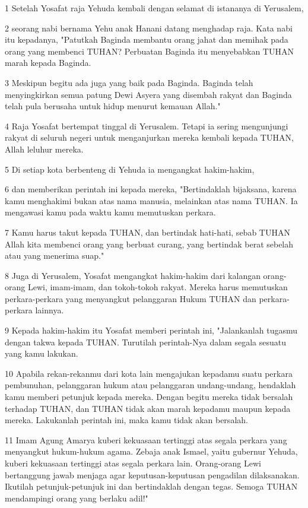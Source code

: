 \par 1 Setelah Yosafat raja Yehuda kembali dengan selamat di istananya di Yerusalem,
\par 2 seorang nabi bernama Yehu anak Hanani datang menghadap raja. Kata nabi itu kepadanya, "Patutkah Baginda membantu orang jahat dan memihak pada orang yang membenci TUHAN? Perbuatan Baginda itu menyebabkan TUHAN marah kepada Baginda.
\par 3 Meskipun begitu ada juga yang baik pada Baginda. Baginda telah menyingkirkan semua patung Dewi Asyera yang disembah rakyat dan Baginda telah pula berusaha untuk hidup menurut kemauan Allah."
\par 4 Raja Yosafat bertempat tinggal di Yerusalem. Tetapi ia sering mengunjungi rakyat di seluruh negeri untuk menganjurkan mereka kembali kepada TUHAN, Allah leluhur mereka.
\par 5 Di setiap kota berbenteng di Yehuda ia mengangkat hakim-hakim,
\par 6 dan memberikan perintah ini kepada mereka, "Bertindaklah bijaksana, karena kamu menghakimi bukan atas nama manusia, melainkan atas nama TUHAN. Ia mengawasi kamu pada waktu kamu memutuskan perkara.
\par 7 Kamu harus takut kepada TUHAN, dan bertindak hati-hati, sebab TUHAN Allah kita membenci orang yang berbuat curang, yang bertindak berat sebelah atau yang menerima suap."
\par 8 Juga di Yerusalem, Yosafat mengangkat hakim-hakim dari kalangan orang-orang Lewi, imam-imam, dan tokoh-tokoh rakyat. Mereka harus memutuskan perkara-perkara yang menyangkut pelanggaran Hukum TUHAN dan perkara-perkara lainnya.
\par 9 Kepada hakim-hakim itu Yosafat memberi perintah ini, "Jalankanlah tugasmu dengan takwa kepada TUHAN. Turutilah perintah-Nya dalam segala sesuatu yang kamu lakukan.
\par 10 Apabila rekan-rekanmu dari kota lain mengajukan kepadamu suatu perkara pembunuhan, pelanggaran hukum atau pelanggaran undang-undang, hendaklah kamu memberi petunjuk kepada mereka. Dengan begitu mereka tidak bersalah terhadap TUHAN, dan TUHAN tidak akan marah kepadamu maupun kepada mereka. Lakukanlah perintah ini, maka kamu tidak akan bersalah.
\par 11 Imam Agung Amarya kuberi kekuasaan tertinggi atas segala perkara yang menyangkut hukum-hukum agama. Zebaja anak Ismael, yaitu gubernur Yehuda, kuberi kekuasaan tertinggi atas segala perkara lain. Orang-orang Lewi bertanggung jawab menjaga agar keputusan-keputusan pengadilan dilaksanakan. Ikutilah petunjuk-petunjuk ini dan bertindaklah dengan tegas. Semoga TUHAN mendampingi orang yang berlaku adil!"

